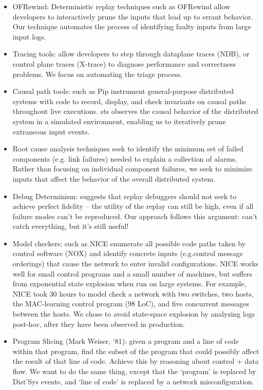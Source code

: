 \begin{itemize}
\item OFRewind: Deterministic replay techniques such as OFRewind allow developers to interactively prune the inputs that lead up to errant behavior. Our technique automates the process of identifying faulty inputs from large input logs.
\item Tracing tools: allow developers to step through dataplane traces (NDB), or control plane traces (X-trace) to diagnose performance and correctness problems. We focus on automating the triage process.
\item Causal path tools: such as Pip instrument general-purpose distributed systems
with code to record, display, and check invariants on causal paths throughout
live executions. sts observes the causal behavior of the
distributed system in a simulated environment, enabling us to iteratively prune extraneous input events.
\item Root cause analysis techniques seek to identify the minimum set of failed
components (e.g. link failures) needed to explain a collection of alarms. Rather than
focusing on individual component failures, we seek to minimize inputs that affect the behavior
of the overall distributed system.
\item Debug Determinism: suggests that replay debuggers should not seek to achieve perfect fidelity -- the utility of the replay can still be high, even if all failure modes can't be reproduced. Our approach follows this argument: can't catch everything, but it's still useful!
\end{itemize}


\begin{itemize}
\item Model checkers: such as NICE enumerate all possible code paths taken by control software (NOX)
and identify concrete inputs (e.g.control message orderings) that cause
the network to enter invalid configurations. NICE works well for small
control programs and a small number of machines, but suffers from exponential
state explosion when run on large systems. For example, NICE took 30 hours to
model check a network with two switches, two hosts, the MAC-learning
control program (98 LoC), and five concurrent
messages between the hosts. We chose to avoid state-space explosion by analyzing logs post-hoc, after they have been observed in production.
\item Program Slicing (Mark Weiser, `81): given a program and a line of code
within that program, find the subset of the program that could possibly affect
the result of that line of code. Achieve this by reasoning about control +
data flow. We want to do the same thing, except that the `program' is replaced
by Dist'Sys events, and `line of code' is replaced by a network misconfiguration.
\end{itemize}


